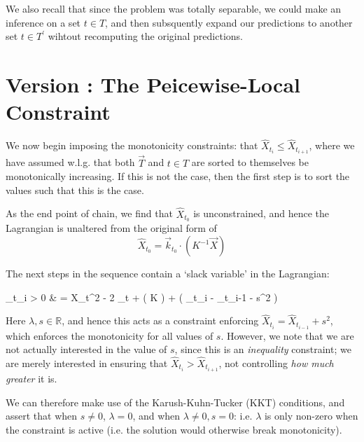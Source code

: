 \documentclass{article}
\def\llangle{\left\langle}
\def\rrangle{\right\rangle}
\newcommand\E[1]{\llangle #1 \rrangle}
\newcounter{version}
\newcommand\attempt[1]{\stepcounter{version} \section*{Version \theversion: #1}}
\begin{document}
		We also recall that since the problem was totally separable, we could make an inference on a set $t \in T$, and then subsquently expand our predictions to another set $t \in T^\prime$ wihtout recomputing the original predictions. 

	\attempt{The Peicewise-Local Constraint}

		We now begin imposing the monotonicity constraints: that $\hat{X}_{t_i} \leq \hat{X}_{t_{i+1}}$, where we have assumed w.l.g. that both $\vec{T}$ and $t \in T$ are sorted to themselves be monotonically increasing. If this is not the case, then the first step is to sort the values such that this is the case. 
		
		As the end point of chain, we find that $\hat{X}_{t_0}$ is unconstrained, and hence the Lagrangian is unaltered from the original form of 
		\begin{equation}
			\hat{X}_{t_0} = \vec{k}_{t_0} \cdot \left( K^{-1} \vec{X} \right)
		\end{equation}

		The next steps in the sequence contain a `slack variable' in the Lagrangian:
		\begin{spalign}
			_{t_{i > 0}} & = \E{X_t^2} - 2 _t \cdot \a + \a \cdot \left( K \a\right) + \lambda \left( \hat{X}_{t_i} - _{t_{i-1}} - s^2 \right)
		\end{spalign}
		Here $\lambda, s \in \mathbb{R}$, and hence this acts as a constraint enforcing $\hat{X}_{t_i} = \hat{X}_{t_{i-1}} + s^2$, which enforces the monotonicity for all values of $s$. However, we note that we are not actually interested in the value of $s$, since this is an \textit{inequality} constraint; we are merely interested in ensuring that $\hat{X}_{t_i} > \hat{X}_{t_{i+1}}$, not controlling \textit{how much greater} it is. 

		We can therefore make use of the Karush-Kuhn-Tucker (KKT) conditions, and assert that when $s \neq 0$, $\lambda = 0$, and when $\lambda \neq 0, s = 0$: i.e. $\lambda$ is only non-zero when the constraint is active (i.e. the solution would otherwise break monotonicity).
\end{document}
